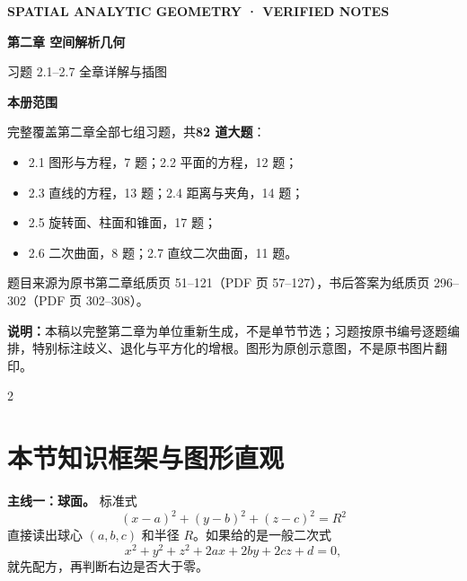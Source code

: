 \documentclass[UTF8,a4paper,11pt,fontset=none]{ctexart}
\newcommand{\tip}[1]{\begin{tcolorbox}[colback=light,colframe=rulegray,boxrule=0.4pt,arc=1.5mm,left=3mm,right=3mm,top=2mm,bottom=2mm]#1\end{tcolorbox}}
\begin{document}
\thispagestyle{empty}
\vspace*{18mm}
{\sffamily\large\color{teal}\bfseries SPATIAL ANALYTIC GEOMETRY · VERIFIED NOTES}\par
\vspace{8mm}
{\sffamily\fontsize{28}{36}\selectfont\bfseries\color{navy} 第二章 空间解析几何}\par
\vspace{3mm}
{\sffamily\fontsize{20}{30}\selectfont\color{blue} 习题 2.1--2.7 \enspace 全章详解与插图}\par
\vspace{12mm}
\begin{tcolorbox}[colback=light,colframe=rulegray,arc=2mm,boxrule=0.6pt,left=5mm,right=5mm,top=5mm,bottom=5mm]
\large\textbf{本册范围}\par\medskip
\normalsize
完整覆盖第二章全部七组习题，共\textbf{82 道大题}：
\begin{itemize}
\item 2.1 图形与方程，7 题；2.2 平面的方程，12 题；
\item 2.3 直线的方程，13 题；2.4 距离与夹角，14 题；
\item 2.5 旋转面、柱面和锥面，17 题；
\item 2.6 二次曲面，8 题；2.7 直纹二次曲面，11 题。
\end{itemize}
题目来源为原书第二章纸质页 51--121（PDF 页 57--127），书后答案为纸质页 296--302（PDF 页 302--308）。
\end{tcolorbox}
\vfill
{\small\noindent\textbf{说明：}本稿以完整第二章为单位重新生成，不是单节节选；习题按原书编号逐题编排，特别标注歧义、退化与平方化的增根。图形为原创示意图，不是原书图片翻印。}\par
\clearpage
\begin{multicols}{2}
\footnotesize\setlength{\parskip}{0pt}\tableofcontents
\end{multicols}
\clearpage

\section*{本节知识框架与图形直观}
\tip{\textbf{主线一：球面。} 标准式
\[
(x-a)^2+(y-b)^2+(z-c)^2=R^2
\]
直接读出球心 $(a,b,c)$ 和半径 $R$。如果给的是一般二次式
\[
 x^2+y^2+z^2+2ax+2by+2cz+d=0,
\]
就先配方，再判断右边是否大于零。}
\end{document}
